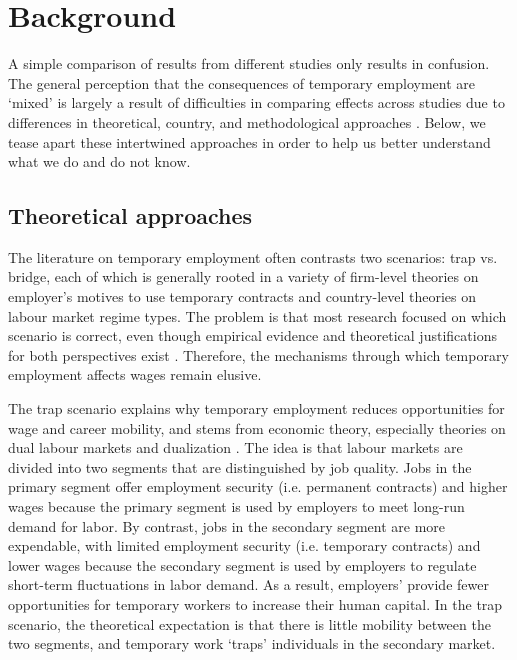 \documentclass[12pt]{article}
\begin{document}
\section{Background}

A simple comparison of results from different studies only results in confusion.  The general perception that the consequences of temporary employment are `mixed' is largely a result of difficulties in comparing effects across studies due to differences in theoretical, country, and methodological approaches \citep{filomena_picchio_2022,latner_wage_2022}.  Below, we tease apart these intertwined approaches in order to help us better understand what we do and do not know.

\subsection{Theoretical approaches}

The literature on temporary employment often contrasts two scenarios: trap vs. bridge, each of which is generally rooted in a variety of firm-level theories on employer's motives to use temporary contracts and country-level theories on labour market regime types.  The problem is that most research focused on which scenario is correct, even though empirical evidence and theoretical justifications for both perspectives exist \citep{mattijssen_occupations_2020}.  Therefore, the mechanisms through which temporary employment affects wages remain elusive.

The trap scenario explains why temporary employment reduces opportunities for wage and career mobility, and stems from economic theory, especially theories on dual labour markets \citep{doeringer_piore_1971,reich_gordon_edwards_1973} and dualization \citep{emmenegger_etal_2012,eichhorst_marx_2015}.  The idea is that labour markets are divided into two segments that are distinguished by job quality.  Jobs in the primary segment offer employment security (i.e. permanent contracts) and higher wages because the primary segment is used by employers to meet long-run demand for labor.  By contrast, jobs in the secondary segment are more expendable, with limited employment security (i.e. temporary contracts) and lower wages because the secondary segment is used by employers to regulate short-term fluctuations in labor demand.  As a result, employers' provide fewer opportunities for temporary workers to increase their human capital.  In the trap scenario, the theoretical expectation is that there is little mobility between the two segments, and temporary work `traps' individuals in the secondary market.  
\end{document}
